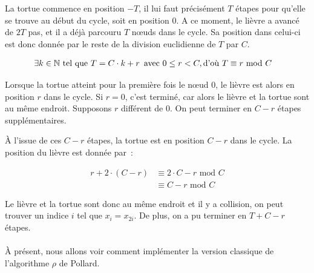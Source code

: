         La tortue commence en position $-T$, il lui faut précisément $T$ étapes pour qu'elle se trouve au début du cycle, soit en position $0$. A ce moment, le lièvre a avancé de $2 T$ pas, et il a déjà parcouru $T$ nœuds dans le cycle. Sa position dans celui-ci est donc donnée par le reste de la division euclidienne de $T$ par $C$.

        \begin{align*}
          \exists k \in \mathbb{N} \text{\ tel que } T = C \cdot k + r \text{\, avec } 0 \leq r < C, \text{d'où } T &\equiv r \text{\ mod } C
        \end{align*}

        Lorsque la tortue atteint pour la première fois le nœud $0$, le lièvre est alors en position $r$ dans le cycle. Si $r=0$, c'est terminé, car alors le lièvre et la tortue sont au même endroit. Supposons $r$ différent de $0$. On peut terminer en $C-r$ étapes supplémentaires.

        À l'issue de ces $C-r$ étapes, la tortue est en position $C-r$ dans le cycle. La position du lièvre est donnée par~:

        \begin{align*}
          r + 2 \cdot (C - r) &\equiv 2 \cdot C -r \text{\ mod } C \\
                              &\equiv C - r \text{\ mod } C
        \end{align*}

        Le lièvre et la tortue sont donc au même endroit et il y a collision, on peut trouver un indice $i$ tel que $x_i = x_{2i}$. De plus, on a pu terminer en $T + C - r$ étapes.

        \paragraph{}
        À présent, nous allons voir comment implémenter la version classique de l'algorithme $\rho$ de Pollard.
